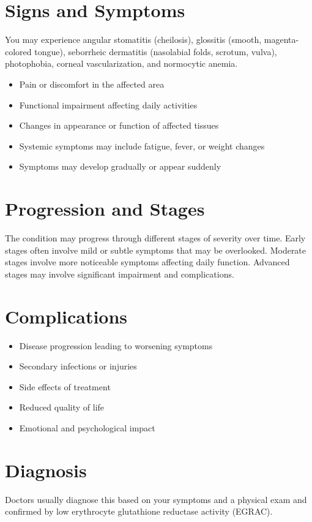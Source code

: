 \section{Signs and Symptoms}
You may experience angular stomatitis (cheilosis), glossitis (smooth, magenta-colored tongue), seborrheic dermatitis (nasolabial folds, scrotum, vulva), photophobia, corneal vascularization, and normocytic anemia.

\begin{itemize}[noitemsep]
  \item Pain or discomfort in the affected area
  \item Functional impairment affecting daily activities
  \item Changes in appearance or function of affected tissues
  \item Systemic symptoms may include fatigue, fever, or weight changes
  \item Symptoms may develop gradually or appear suddenly
\end{itemize}
\section{Progression and Stages}
The condition may progress through different stages of severity over time. Early stages often involve mild or subtle symptoms that may be overlooked. Moderate stages involve more noticeable symptoms affecting daily function. Advanced stages may involve significant impairment and complications.
\section{Complications}
\begin{itemize}[noitemsep]
  \item Disease progression leading to worsening symptoms
  \item Secondary infections or injuries
  \item Side effects of treatment
  \item Reduced quality of life
  \item Emotional and psychological impact
\end{itemize}
\section{Diagnosis}
Doctors usually diagnose this based on your symptoms and a physical exam and confirmed by low erythrocyte glutathione reductase activity (EGRAC).

